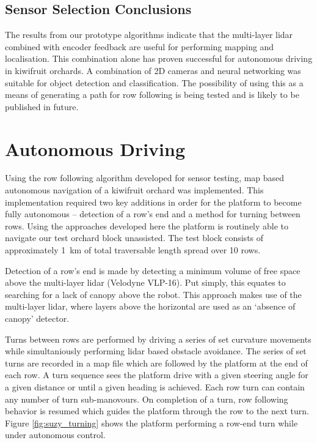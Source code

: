 \documentclass[preprint,authoryear,12pt]{elsarticle}
\begin{document}
\subsection{Sensor Selection Conclusions}
    The results from our prototype algorithms indicate that the multi-layer lidar combined with encoder feedback are useful for performing mapping and localisation.
    This combination alone has proven successful for autonomous driving in kiwifruit orchards.
    A combination of 2D cameras and neural networking was suitable for object detection and classification.
    The possibility of using this as a means of generating a path for row following is being tested and is likely to be published in future.



\section{Autonomous Driving}
\label{sect:autonomous}
    Using the row following algorithm developed for sensor testing, map based autonomous navigation of a kiwifruit orchard was implemented.
    This implementation required two key additions in order for the platform to become fully autonomous -- detection of a row's end and a method for turning between rows.
    Using the approaches developed here the platform is routinely able to navigate our test orchard block unassisted.
    The test block consists of approximately \SI{1}{\kilo\meter} of total traversable length spread over 10 rows.

    Detection of a row's end is made by detecting a minimum volume of free space above the multi-layer lidar (Velodyne VLP-16).
    Put simply, this equates to searching for a lack of canopy above the robot.
    This approach makes use of the multi-layer lidar, where layers above the horizontal are used as an `absence of canopy' detector.

    Turns between rows are performed by driving a series of set curvature movements while simultaniously performing lidar based obstacle avoidance.
    The series of set turns are recorded in a map file which are followed by the platform at the end of each row.
    A turn sequence sees the platform drive with a given steering angle for a given distance or until a given heading is achieved.
    Each row turn can contain any number of turn sub-manovours.
    On completion of a turn, row following behavior is resumed which guides the platform through the row to the next turn.
    Figure \ref{fig:suzy_turning} shows the platform performing a row-end turn while under autonomous control.
\end{document}
